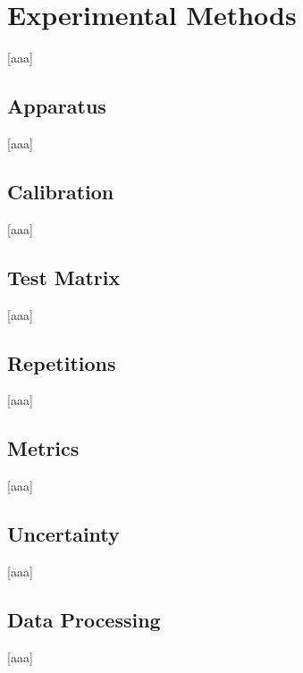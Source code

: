 \chapter{Experimental Methods} \label{sec:Experimental Methods}
    [aaa]

\section{Apparatus} \label{sec:Apparatus}
    [aaa]

\section{Calibration} \label{sec:Calibration}
    [aaa]

\section{Test Matrix} \label{sec:Test Matrix}
    [aaa]

\section{Repetitions} \label{sec:Repetitions}
    [aaa]

\section{Metrics} \label{sec:Metrics}
    [aaa]

\section{Uncertainty} \label{sec:Uncertainty}
    [aaa]

\section{Data Processing} \label{sec:Data Processing}
    [aaa]
